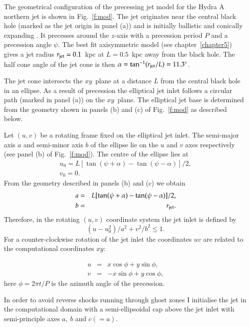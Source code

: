  The geometrical configuration of the precessing jet model for the Hydra A northern jet is shown in Fig.~\ref{f:mod}.  The jet originates near the central black hole (marked as the jet origin in panel (a)) and is initially ballistic and conically expanding \citep{komissarov98, krause12, nawaz14a}. It precesses around the $z$-axis with a precession period $P$ and a precession angle $\psi$. The best fit axisymmetric model (see chapter~\ref{chapter5}) gives a jet radius $r_{\rm jet} = 0.1$~kpc at $L=0.5$~kpc away from the black hole. The half cone angle of the jet cone is then $\alpha = \tan^{-1}(r_{\rm jet}/L) = 11.3^{\circ}$.

The jet cone intersects the $xy$~plane at a distance $L$ from the central black hole in an ellipse. As a result of precession the elliptical jet inlet follows a circular path (marked in panel (a)) on the $xy$~plane. The elliptical jet base is determined from the geometry shown in panels (b) and (c) of Fig.~\ref{f:mod} as described below.  

Let $(u,v)$ be a rotating frame fixed on the elliptical jet inlet. The semi-major axis $a$ and semi-minor axis $b$ of the ellipse lie on the $u$ and $v$ axes respectively (see panel (b) of Fig.~\ref{f:mod}). The centre of the ellipse lies at 
\begin{eqnarray}
u_0 = L[\tan(\psi+\alpha) - \tan(\psi - \alpha)]/2, \\
v_0 = 0.
\end{eqnarray}
From the geometry described in panels (b) and (c) we obtain 
\begin{eqnarray}
a &=& L[\tan(\psi + \alpha) - \tan(\psi -\alpha)]/2, \\
b &=& r_{\rm jet}.
\end{eqnarray}
Therefore, in the rotating $(u,v)$ coordinate system the jet inlet is defined by 
\begin{equation}
(u - u_0^2)/a^2 + v^2/ b^2 \leq 1.
\end{equation}
For a counter-clockwise rotation of the jet inlet the coordinates $uv$ are related to the computational coordinates $xy$: 

\begin{eqnarray}
u &=& x\cos \phi + y \sin \phi, \\
v &= &- x \sin \phi + y \cos \phi,
\end{eqnarray} 
here $\phi = 2\pi t/P$ is the azimuth angle of the precession. 

In order to avoid reverse shocks running through ghost zones I initialise the jet in the computational domain with a semi-ellipsoidal cap above the jet inlet with semi-principle axes $a, \ b$ and $c (= a)$. 


